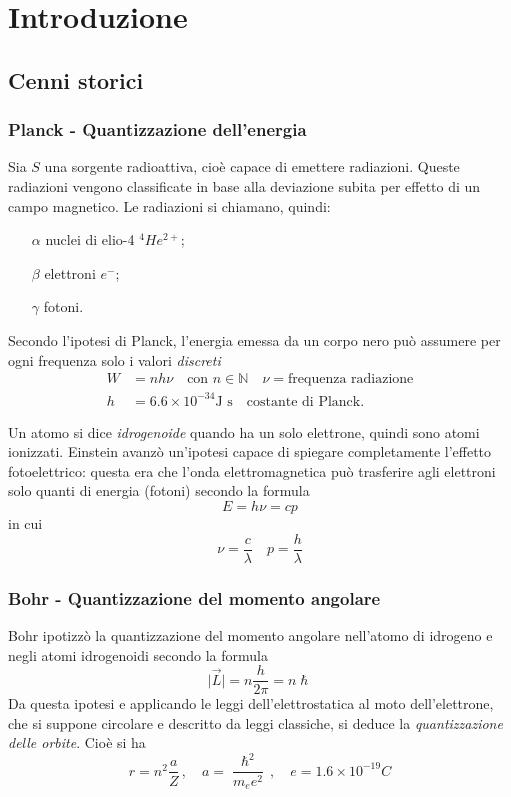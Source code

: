 \part{Introduzione}
\chapter{Cenni storici}
\section{Planck - Quantizzazione dell'energia}
Sia $S$ una sorgente radioattiva, cioè capace di 
emettere radiazioni. Queste radiazioni vengono classificate in base alla 
deviazione subita per effetto di un campo magnetico. Le radiazioni si chiamano, 
quindi:
\begin{itemize}
 \item[$\alpha$] nuclei di elio-4 $^4He^{2+}$;
 \item[$\beta$] elettroni $e^-$;
 \item[$\gamma$] fotoni. 
\end{itemize}

Secondo l'ipotesi di Planck, l'energia emessa da un corpo nero può assumere 
per ogni frequenza solo i valori \textit{discreti}
\begin{equation}\begin{split}
 W &= nh\nu\quad\text{con }n\in\mathbb{N}\quad\nu = \text{frequenza 
radiazione}\\
 h &= 6.6\times 10^{-34} \text{J s} \quad \text{costante di Planck.}
\end{split}\end{equation}

Un atomo si dice \textit{idrogenoide} quando ha un solo elettrone, quindi sono 
atomi ionizzati. Einstein avanzò un'ipotesi capace di spiegare completamente 
l'effetto fotoelettrico: questa era che l'onda elettromagnetica può trasferire 
agli elettroni solo quanti di energia (fotoni) secondo la formula
\begin{equation}
 \label{eq:energia_fotone}
 E = h\nu = cp
\end{equation}
in cui
\[
 \nu = \frac{c}{\lambda}\quad p = \frac{h}{\lambda}
\]
\section{Bohr - Quantizzazione del momento angolare}
Bohr ipotizzò la quantizzazione del momento angolare nell'atomo di idrogeno e 
negli atomi idrogenoidi secondo la formula
\begin{equation}
 \rvert\vec{L}\lvert = n\frac{h}{2\pi} = n\hslash
\end{equation}
Da questa ipotesi e applicando le leggi dell'elettrostatica al moto 
dell'elettrone, che si suppone circolare e descritto da leggi classiche, si 
deduce la \textit{quantizzazione delle orbite}. Cioè si ha
\begin{equation}
 r = n^2\frac{a}{Z}\,,\quad a=\frac{\hslash^2}{m_ee^2}\,,\quad e = 1.6\times 
10^{-19}C
\end{equation}


